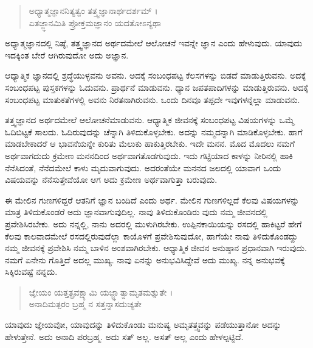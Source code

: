 \begin{verse}
ಅಧ್ಯಾತ್ಮಜ್ಞಾನನಿತ್ಯತ್ವಂ ತತ್ತ್ವಜ್ಞಾನಾರ್ಥದರ್ಶಮ್ ।\\ಏತಜ್ಜ್ಞಾನಮಿತಿ ಪ್ರೋಕ್ತಮಜ್ಞಾನಂ ಯದತೋಽನ್ಯಥಾ 
\end{verse}

{\small ಅಧ್ಯಾತ್ಮಜ್ಞಾನದಲ್ಲಿ ನಿಷ್ಠೆ, ತತ್ತ್ವಜ್ಞಾನದ ಅರ್ಥದಮೇಲೆ ಆಲೋಚನೆ ಇವನ್ನೇ ಜ್ಞಾನ ಎಂದು ಹೇಳುವುದು. ಯಾವುದು ಇದಕ್ಕಿಂತ ಬೇರೆ ಆಗಿರುವುದೋ ಅದು ಅಜ್ಞಾನ.}

ಆಧ್ಯಾತ್ಮಿಕ ಜ್ಞಾನದಲ್ಲಿ ಶ್ರದ್ಧೆಯುಳ್ಳವನು ಅವನು. ಅದಕ್ಕೆ ಸಂಬಂಧಪಟ್ಟ ಕೆಲಸಗಳನ್ನು ಬಿಡದೆ ಮಾಡುತ್ತಿರುವನು. ಅದಕ್ಕೆ ಸಂಬಂಧಪಟ್ಟ ಪುಸ್ತಕಗಳನ್ನು ಓದುವನು. ಪ್ರಾರ್ಥನೆ ಮಾಡುವನು. ಧ್ಯಾನ ಜಪತಪಾದಿಗಳನ್ನು ಮಾಡುತ್ತಿರುವನು. ಅದಕ್ಕೆ ಸಂಬಂಧಪಟ್ಟ ಮಾತುಕತೆಗಳಲ್ಲಿ ಅವನು ನಿರತನಾಗಿರುವನು. ಒಂದು ದಿನವೂ ತಪ್ಪದೇ ಇವುಗಳನ್ನೆಲ್ಲಾ ಮಾಡುವನು.

ತತ್ತ್ವಜ್ಞಾನದ ಅರ್ಥದಮೇಲೆ ಆಲೋಚನೆಮಾಡುವನು. ಆಧ್ಯಾತ್ಮಿಕ ಜೀವನಕ್ಕೆ ಸಂಬಂಧಪಟ್ಟ ವಿಷಯಗಳನ್ನು ಒಮ್ಮೆ ಓದಿಬಿಟ್ಟಕೆ ಸಾಲದು. ಓದಿರುವುದನ್ನು ಚೆನ್ನಾಗಿ ತಿಳಿದುಕೊಳ್ಳಬೇಕು. ಅದನ್ನು ನಮ್ಮದನ್ನಾಗಿ ಮಾಡಿಕೊಳ್ಳಬೇಕು. ಹಾಗೆ ಮಾಡಬೇಕಾದರೆ ಆ ಭಾವನೆಯನ್ನೇ ಕುರಿತು ಮೆಲುಕು ಹಾಕುತ್ತಿರಬೇಕು. ಇದೇ ಮನನ. ಮೊದ ಮೊದಲು ನಮಗೆ ಅರ್ಥವಾಗದುದು ಕ್ರಮೇಣ ಮನನದಿಂದ ಅರ್ಥವಾಗತೊಡಗುವುದು. ಇದು ಗಟ್ಟಿಯಾದ ಕಾಳನ್ನು ನೀರಿನಲ್ಲಿ ಹಾಕಿ ನೆನೆಸಿದಂತೆ, ನೆನೆದಮೇಲೆ ಕಾಳು ಮೃದುವಾಗುವುದು. ಅದರಂತೆಯೇ ಮನನದ ಜಲದಲ್ಲಿ ಯಾವಾಗ ಒಂದು ವಿಷಯವನ್ನು ನೆನೆಸುತ್ತೇವೆಯೋ ಆಗ ಅದು ಕ್ರಮೇಣ ಅರ್ಥವಾಗುತ್ತಾ ಬರುವುದು.

ಈ ಮೇಲಿನ ಗುಣಗಳಿದ್ದರೆ ಆತನಿಗೆ ಜ್ಞಾನ ಬಂದಿದೆ ಎಂದು ಅರ್ಥ. ಮೇಲಿನ ಗುಣಗಳಿಲ್ಲದೆ ಕೆಲವು ವಿಷಯಗಳನ್ನು ಮಾತ್ರ ತಿಳಿದುಕೊಂಡರೆ ಅದು ಜ್ಞಾನವಾಗುವುದಿಲ್ಲ. ನಾವು ತಿಳಿದುಕೊಂಡಿರು ವುದು ನಮ್ಮ ಜೀವನದಲ್ಲಿ ಪ್ರವೇಶಿಸಿರಬೇಕು. ಅದು ನನ್ನಲ್ಲಿ, ನಾನು ಅದರಲ್ಲಿ ಮುಳುಗಿರಬೇಕು. ಉಪ್ಪಿನಕಾಯಿಯನ್ನು ರಸದಲ್ಲಿ ಹಾಕಿಟ್ಟರೆ ಹೇಗೆ ಕೆಲವು ಕಾಲವಾದಮೇಲೆ ರಸದಲ್ಲಿರುವುದೆಲ್ಲಾ ಕಾಯೊಳಗೆ ಪ್ರವೇಶಿಸುವುದೋ, ಹಾಗೆಯೇ ನಾವು ತಿಳಿದುಕೊಂಡದ್ದು ನಮ್ಮ ಜೀವನಕ್ಕೆ ಪ್ರವೇಶಿಸಿ ನಮ್ಮ ಬಾಳಿನ ಅಂಶವಾಗಿರಬೇಕು. ಆಧ್ಯಾತ್ಮಿಕ ಜೀವನ ಅನುಷ್ಠಾನ ಪ್ರಧಾನವಾಗಿ ಇರುವುದು. ನಮಗೆ ಏನೇನು ಗೊತ್ತಿದೆ ಅದಲ್ಲ ಮುಖ್ಯ. ನಾವು ಏನನ್ನು ಅನುಭವಿಸಿದ್ದೇವೆ ಅದು ಮುಖ್ಯ. ನನ್ನ ಅನುಭವಕ್ಕೆ ಸಿಕ್ಕಿರುವಷ್ಟೆ ನನ್ನದು.\eng{}

\begin{verse}
ಜ್ಞೇಯಂ ಯತ್ತತ್ಪ್ರವಕ್ಷ್ಯಾಮಿ ಯಜ್ಜ್ಞಾತ್ವಾಮೃತಮಶ್ನುತೇ ।\\ಅನಾದಿಮತ್ಪರಂ ಬ್ರಹ್ಮ ನ ಸತ್ತನ್ನಾಸದುಚ್ಯತೇ 
\end{verse}

{\small ಯಾವುದು ಜ್ಞೇಯವೋ, ಯಾವುದನ್ನು ತಿಳಿದುಕೊಂಡು ಮನುಷ್ಯ ಅಮೃತತ್ತ್ವವನ್ನು ಪಡೆಯುತ್ತಾನೋ ಅದನ್ನು ಹೇಳುತ್ತೇನೆ. ಅದು ಅನಾದಿ ಪರಬ್ರಹ್ಮ. ಅದು ಸತ್ ಅಲ್ಲ. ಅಸತ್ ಅಲ್ಲ ಎಂದು ಹೇಳಲ್ಪಟ್ಟಿದೆ.}

